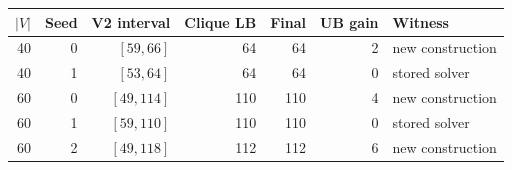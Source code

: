 \begin{tabular}{@{}rrrrrrl@{}}
\toprule
$|V|$ & Seed & V2 interval & Clique LB & Final & UB gain & Witness\\
\midrule
40 & 0 & $[59,66]$ & 64 & 64 & 2 & new construction\\
40 & 1 & $[53,64]$ & 64 & 64 & 0 & stored solver\\
60 & 0 & $[49,114]$ & 110 & 110 & 4 & new construction\\
60 & 1 & $[59,110]$ & 110 & 110 & 0 & stored solver\\
60 & 2 & $[49,118]$ & 112 & 112 & 6 & new construction\\
\bottomrule
\end{tabular}
